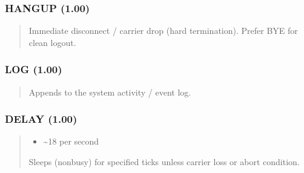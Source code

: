 \documentclass[letterpaper,10pt,english]{sphinxmanual}
\begin{document}
\subsubsection{HANGUP (1.00)}
\label{\detokenize{ppl:hangup-1-00}}\begin{quote}

\sphinxAtStartPar
{}
\begin{description}
\sphinxAtStartPar
Immediate disconnect / carrier drop (hard termination). Prefer BYE for clean logout.

\end{description}
\end{quote}


\subsubsection{LOG (1.00)}
\label{\detokenize{ppl:log-1-00}}\begin{quote}

\sphinxAtStartPar
{}
\begin{description}
\sphinxAtStartPar
Appends  to the system activity / event log.

\end{description}
\end{quote}


\subsubsection{DELAY (1.00)}
\label{\detokenize{ppl:delay-1-00}}\begin{quote}

\sphinxAtStartPar
{}
\begin{description}
\begin{itemize}
\item {} 
\sphinxAtStartPar
{} \textendash{} \textasciitilde{}18 per second

\end{itemize}

\sphinxAtStartPar
Sleeps (non\sphinxhyphen{}busy) for specified ticks unless carrier loss or abort condition.

\end{description}
\end{quote}
\end{document}
